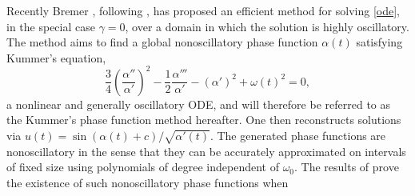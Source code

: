 \documentclass[10pt]{article}
\newcommand{\be}{\begin{equation}}
\newcommand{\ee}{\end{equation}}
\newcommand{\eg}{{\it e.g.\ }}
\newcommand{\bigO}{{\mathcal O}}
\newcommand{\om}{\omega}
\newcommand{\g}{\gamma}
\newcommand{\AB}[1]{{\color{orange}#1}}
\begin{document}
Recently Bremer \cite{bremer2018}, following \cite{heitman2015,bremer2016},
has proposed an efficient
method for solving \cref{ode}, in the special case $\g = 0$,
over a domain in which the solution is highly oscillatory.
The method aims to find a global nonoscillatory phase function $\alpha(t)$
satisfying Kummer's equation,
\be
\frac{3}{4} \left(\frac{\alpha''}{\alpha'}\right)^2 - \frac{1}{2}\frac{\alpha'''}{\alpha'} - (\alpha')^2 +
\om(t)^2 = 0,
\label{kummer}
\ee
a nonlinear and generally oscillatory ODE, and will therefore be referred to as the Kummer's phase function method hereafter.
%
One then reconstructs solutions
via $u(t) = \sin(\alpha(t) + c)/\sqrt{\alpha'(t)}$.
%
%
The generated phase functions are nonoscillatory in the sense that they can be
accurately approximated on intervals of fixed size
using polynomials of degree independent of $\om_0$.
The results of \cite{heitman2015,bremer2016}
prove the existence of such nonoscillatory phase functions when
\end{document}
